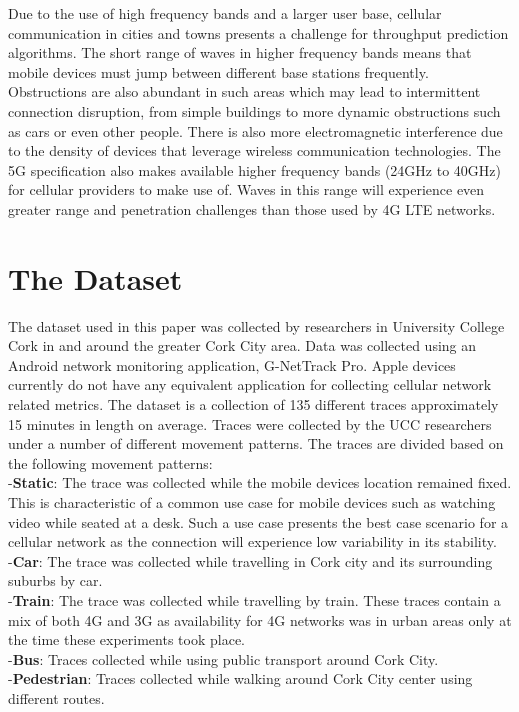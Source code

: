 Due to the use of high frequency bands and a larger user base, cellular communication in cities and towns presents a challenge for throughput prediction algorithms. The short range of waves in higher frequency bands means that mobile devices must jump between different base stations frequently. Obstructions are also abundant in such areas which may lead to intermittent connection disruption, from simple buildings to more dynamic obstructions such as cars or even other people. There is also more electromagnetic interference due to the density of devices that leverage wireless communication technologies. The 5G specification also makes available higher frequency bands (24GHz to 40GHz) for cellular providers to make use of. Waves in this range will experience even greater range and penetration challenges than those used by 4G LTE networks. \\


\section{The Dataset}
The dataset used in this paper was collected by researchers in University College Cork in and around the greater Cork City area. Data was collected using an Android network monitoring application, G-NetTrack Pro. Apple devices currently do not have any equivalent application for collecting cellular network related metrics. The dataset is a collection of 135 different traces approximately 15 minutes in length on average. Traces were collected by the UCC researchers under a number of different movement patterns. The traces are divided based on the following movement patterns: \\
-\textbf{Static}: The trace was collected while the mobile devices location remained fixed. This is characteristic of a common use case for mobile devices such as watching video while seated at a desk. Such a use case presents the best case scenario for a cellular network as the connection will experience low variability in its stability. \\
-\textbf{Car}: The trace was collected while travelling in Cork city and its surrounding suburbs by car. \\
-\textbf{Train}: The trace was collected while travelling by train. These traces contain a mix of both 4G and 3G as availability for 4G networks was in urban areas only at the time these experiments took place. \\
-\textbf{Bus}: Traces collected while using public transport around Cork City. \\
-\textbf{Pedestrian}: Traces collected while walking around Cork City center using different routes. \\

